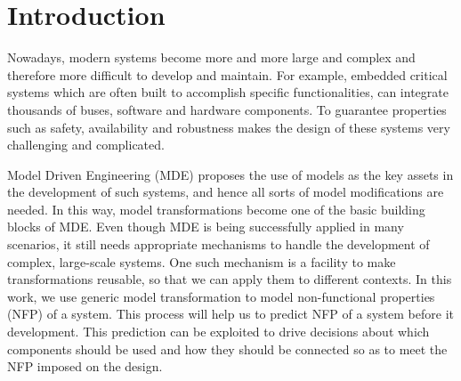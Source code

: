 \documentclass[conference]{IEEEtran}
\begin{document}




\IEEEpeerreviewmaketitle

\section{Introduction}
Nowadays, modern systems become more and more large and complex and therefore more difficult to develop and maintain. For example, embedded critical systems which are often built to accomplish specific functionalities, can integrate thousands of buses, software and hardware components. To guarantee properties such as safety, availability and robustness makes the design of these systems very challenging and complicated.

Model Driven Engineering (MDE) proposes the use of models as the key assets in the development of such systems, and hence all sorts of model modifications are needed. In this way, model transformations become one of the basic building blocks of MDE. Even though MDE is being successfully applied in many scenarios, it still needs appropriate mechanisms to handle the development of complex, large-scale systems. One such mechanism is a facility to make transformations reusable, so that we can apply them to different contexts. In this work, we use generic model transformation to model non-functional properties (NFP) of a system. This process will help us to predict NFP of a system before it development\cite{1291833}. This prediction can be exploited to drive decisions about which components should be used and how they should be connected so as to meet the NFP imposed on the design.
\end{document}
